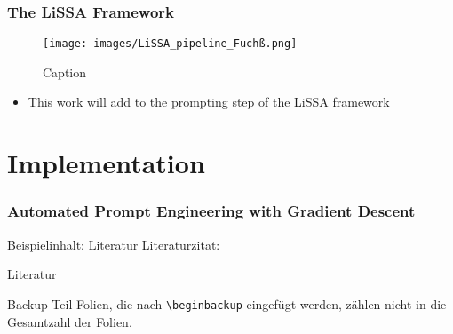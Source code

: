 \documentclass{sdqbeamer}
\begin{document}
\begin{frame}
\frametitle{The LiSSA Framework}
    \begin{figure}
        \centering
        \texttt{[image: images/LiSSA\_pipeline\_Fuchß.png]}
        \caption{Caption}
        \label{fig:enter-label}
    \end{figure}
    \begin{itemize}
        \item This work will add to the prompting step of the LiSSA framework
    \end{itemize}
    
\end{frame}

\section{Implementation}

\begin{frame}[picture 50 vertical, picture=images/artifact_overview_Fuchß.png]
\frametitle{Automated Prompt Engineering with Gradient Descent}
    
\end{frame}






\begin{frame}{Beispielinhalt: Literatur}
    Literaturzitat: \cite{klare2021jss}
\end{frame}

\appendix
\beginbackup

\begin{frame}{Literatur}
\begin{exampleblock}{Backup-Teil}
    Folien, die nach \texttt{\textbackslash beginbackup} eingefügt werden, zählen nicht in die Gesamtzahl der Folien.
\end{exampleblock}

\printbibliography
\end{frame}
\end{document}
